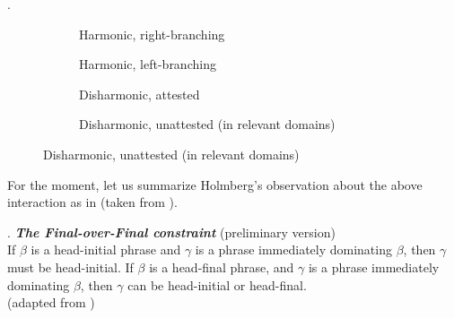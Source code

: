 \documentclass[output=paper]{langscibook}
\begin{document}
{\ex.\protect\label{fofcstructures}

\vspace*{-1cm}\begin{figure}[h!]
\begin{subfigure}{.25\textwidth}
  \caption{Harmonic, right-branching}
  \label{fig:sub1}
\end{subfigure}\hfill
\begin{subfigure}{.25\textwidth}
  \caption{Harmonic, left-branching}
  \label{fig:sub2}
\end{subfigure}\hfill
\begin{subfigure}{.25\textwidth}
  \caption{Disharmonic, attested}
  \label{fig:sub1}
\end{subfigure}\hfill
\begin{subfigure}{.22\textwidth}
{}
  \caption{Disharmonic, unattested (in relevant domains)}
  \label{fig:sub2}
\end{subfigure}%
\end{figure}

}




For the moment, let us summarize Holmberg's observation about the above interaction as in \Next (taken from \cite{biberaueretal2014}).

\ex. \textbf{\textit{The Final-over-Final constraint}} (preliminary version)\\ \protect\label{fofc1}
If $\beta$ is a head-initial phrase and  $\gamma$ is a phrase immediately dominating $\beta$, then $\gamma$ must
be head-initial. If $\beta$ is a head-final phrase, and  $\gamma$ is a phrase immediately dominating
$\beta$, then  $\gamma$ can be head-initial or head-final.\\
(adapted from \cite{biberaueretal2014})
\end{document}
